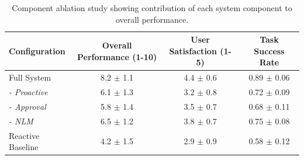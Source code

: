 \begin{table}[t]
\centering
\caption{Component ablation study showing contribution of each system component to overall performance.}
\label{tab:ablation}
\begin{tabular}{lccc}
\toprule
Configuration & Overall Performance (1-10) & User Satisfaction (1-5) & Task Success Rate \\
\midrule
Full System & 8.2 $\pm$ 1.1 & 4.4 $\pm$ 0.6 & 0.89 $\pm$ 0.06 \\
\textit{- Proactive} & 6.1 $\pm$ 1.3 & 3.2 $\pm$ 0.8 & 0.72 $\pm$ 0.09 \\
\textit{- Approval} & 5.8 $\pm$ 1.4 & 3.5 $\pm$ 0.7 & 0.68 $\pm$ 0.11 \\
\textit{- NLM} & 6.5 $\pm$ 1.2 & 3.8 $\pm$ 0.7 & 0.75 $\pm$ 0.08 \\
Reactive Baseline & 4.2 $\pm$ 1.5 & 2.9 $\pm$ 0.9 & 0.58 $\pm$ 0.12 \\
\bottomrule
\end{tabular}
\end{table}
